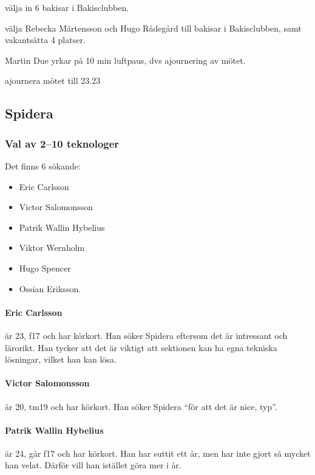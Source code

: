 \documentclass[hidelinks]{sektionsmote}
\begin{document}
\begin{beslut}
  \item välja in 6 bakisar i Bakisclubben.
  \item välja Rebecka Mårtensson och Hugo Rådegård till bakisar i Bakisclubben, samt vakantsätta 4 platser.
\end{beslut}

\begin{ofraga}
  Martin Due yrkar på 10 min luftpaus, dvs ajournering av mötet.
  \begin{beslut}
    \item ajournera mötet till 23.23
  \end{beslut}
\end{ofraga}


\subsection{Spidera}
\subsubsection{Val av 2--10 teknologer}
Det finns 6 sökande:
\begin{itemize}
    \item Eric Carlsson
    \item Victor Salomonsson
    \item Patrik Wallin Hybelius
    \item Viktor Wernholm
    \item Hugo Spencer
    \item Ossian Eriksson.
\end{itemize}

\paragraph{Eric Carlsson} är 23, f17 och har körkort.
Han söker Spidera eftersom det är intressant och lärorikt.
Han tycker att det är viktigt att sektionen kan ha egna tekniska lösningar, vilket han kan lösa.

\paragraph{Victor Salomonsson} är 20, tm19 och har körkort.
Han söker Spidera \enquote{för att det är nice, typ}.

\paragraph{Patrik Wallin Hybelius} är 24, går f17 och har körkort.
Han har suttit ett år, men har inte gjort så mycket han velat.
Därför vill han istället göra mer i år.
\end{document}
